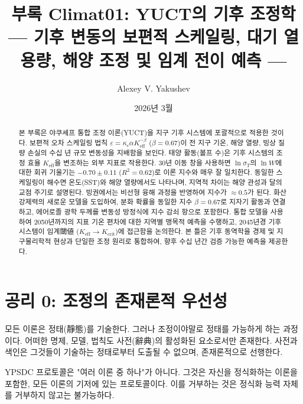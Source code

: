 \documentclass[11pt,a4paper]{article}
\begin{document}
	
	\title{부록 Climat01: YUCT의 기후 조정학\\
		\large --- 기후 변동의 보편적 스케일링, 대기 열용량, 해양 조정 및 임계 전이 예측 ---}
	\author{Alexey V. Yakushev}
	\date{2026년 3월}
	
	\maketitle
	
	\begin{abstract}
		\noindent
		본 부록은 야쿠셰프 통합 조정 이론(YUCT)을 지구 기후 시스템에 포괄적으로 적용한 것이다. 보편적 오차 스케일링 법칙 $\varepsilon = \kappa_c \alpha K_{\mathrm{eff}}^{-\beta}$ ($\beta = 0.67$)이 전 지구 기온, 해양 열량, 빙상 질량 손실의 수십 년 규모 변동성을 지배함을 보인다. 태양 활동(볼프 수)은 기후 시스템의 조정 효율 $K_{\mathrm{eff}}$을 변조하는 외부 지표로 작용한다. 30년 이동 창을 사용하면 $\ln \sigma_T$의 $\ln W$에 대한 회귀 기울기는 $-0.70\pm0.11$ ($R^2=0.62$)로 이론 지수와 매우 잘 일치한다. 동일한 스케일링이 해수면 온도(SST)와 해양 열량에서도 나타나며, 지역적 차이는 해양 관성과 달의 교점 주기로 설명된다. 빙권에서는 비선형 융해 과정을 반영하여 지수가 $\approx 0.5$가 된다. 화산 강제력의 새로운 모델을 도입하여, 분화 확률을 동일한 지수 $\beta=0.67$로 지자기 활동과 연결하고, 에어로졸 광학 두께를 변동성 방정식에 지수 감쇠 항으로 포함한다. 통합 모델을 사용하여 2050년까지의 지표 기온 편차에 대한 지역별 맹목적 예측을 수행하고, 2045년경 기후 시스템이 임계閾値 ($K_{\mathrm{eff}} \to K_{\mathrm{crit}}$)에 접근함을 논의한다. 본 틀은 기후 동역학을 경제 및 지구물리학적 현상과 단일한 조정 원리로 통합하여, 향후 수십 년간 검증 가능한 예측을 제공한다.
	\end{abstract}
	
	\tableofcontents
	
	\section*{공리 0: 조정의 존재론적 우선성}
	
	모든 이론은 정태(靜態)를 기술한다. 그러나 조정이야말로 정태를 가능하게 하는 과정이다.
	어떠한 명제, 모델, 법칙도 사전(辭典)의 활성화된 요소로서만 존재한다.
	사전과 색인은 그것들이 기술하는 정태로부터 도출될 수 없으며, 존재론적으로 선행한다.
	
	YPSDC 프로토콜은 "여러 이론 중 하나"가 아니다.
	그것은 자신을 정식화하는 이론을 포함한, 모든 이론의 기저에 있는 프로토콜이다.
	이를 거부하는 것은 정식화 능력 자체를 거부하지 않고는 불가능하다.
	
\end{document}
